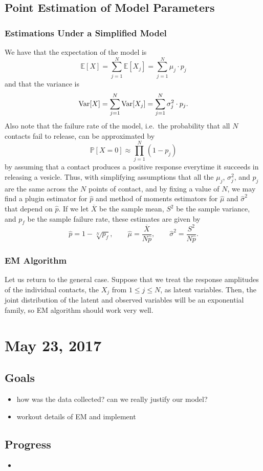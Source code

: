 \documentclass{article}
\begin{document}
\subsection{Point Estimation of Model Parameters}
\subsubsection{Estimations Under a Simplified Model}
We have that the expectation of the model is
\[
  \mathbb E[X] = \sum_{j=1}^N \mathbb E[X_j] = \sum_{j=1}^N \mu_j\cdot p_j
\]
and that the variance is
\[
  \operatorname{Var}[X] = \sum_{j=1}^N \operatorname{Var}[X_j] = \sum_{j=1}^N \sigma_j^2\cdot p_j.
\]
Also note that the failure rate of the model, i.e.\ the probability that all $N$ contacts fail to release, can be approximated by
\[
  \mathbb P[X = 0]\approx \prod_{j=1}^N (1-p_j)
\]
by assuming that a contact produces a positive response everytime it succeeds in releasing a vesicle. Thus, with simplifying assumptions that all the $\mu_j$, $\sigma_j^2$, and $p_j$ are the same across the $N$ points of contact, and by fixing a value of $N$, we may find a plugin estimator for $\hat p$ and method of moments estimators for $\hat\mu$ and $\hat\sigma^2$ that depend on $\hat p$. If we let $\overline X$ be the sample mean, $S^2$ be the sample variance, and $p_f$ be the sample failure rate, these estimates are given by
\[
  \hat p = 1 - \sqrt[N]{p_f}, \qquad \hat\mu = \frac{\overline X}{N\hat p}, \qquad \hat\sigma^2 = \frac{S^2}{N\hat p}.
\]

\subsubsection{EM Algorithm}
Let us return to the general case. Suppose that we treat the response amplitudes of the individual contacts, the $X_j$ from $1\leq j\leq N$, as latent variables. Then, the joint distribution of the latent and observed variables will be an exponential family, so EM algorithm should work very well.

\section{May 23, 2017}
\subsection{Goals}
\begin{itemize}
  \item how was the data collected? can we really justify our model?
  \item workout details of EM and implement
\end{itemize}

\subsection{Progress}
\begin{itemize}
  \item 
\end{itemize}



\end{document}
